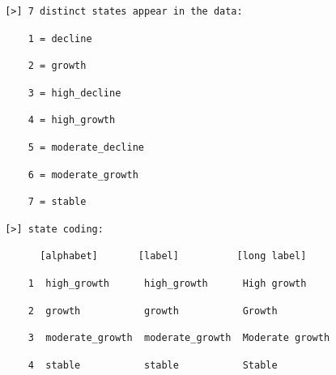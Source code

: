 \documentclass[
  letterpaper,
  DIV=11,
  numbers=noendperiod]{scrreprt}
\begin{document}
\begin{verbatim}
 [>] 7 distinct states appear in the data: 
\end{verbatim}

\begin{verbatim}
     1 = decline
\end{verbatim}

\begin{verbatim}
     2 = growth
\end{verbatim}

\begin{verbatim}
     3 = high_decline
\end{verbatim}

\begin{verbatim}
     4 = high_growth
\end{verbatim}

\begin{verbatim}
     5 = moderate_decline
\end{verbatim}

\begin{verbatim}
     6 = moderate_growth
\end{verbatim}

\begin{verbatim}
     7 = stable
\end{verbatim}

\begin{verbatim}
 [>] state coding:
\end{verbatim}

\begin{verbatim}
       [alphabet]       [label]          [long label] 
\end{verbatim}

\begin{verbatim}
     1  high_growth      high_growth      High growth
\end{verbatim}

\begin{verbatim}
     2  growth           growth           Growth
\end{verbatim}

\begin{verbatim}
     3  moderate_growth  moderate_growth  Moderate growth
\end{verbatim}

\begin{verbatim}
     4  stable           stable           Stable
\end{verbatim}
\end{document}
